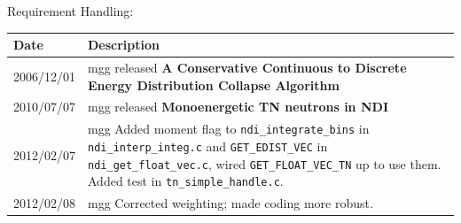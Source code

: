 Requirement Handling:

\begin{tabular}{|p{72pt}|p{351pt}|} \hline
Date & Description \\ \hline 

2006/12/01 & mgg released \textbf{A Conservative Continuous to
Discrete Energy Distribution Collapse Algorithm} \\ \hline

2010/07/07 & mgg released \textbf{Monoenergetic TN neutrons in NDI} \\
\hline

2012/02/07 & mgg Added moment flag to \texttt{ndi\_integrate\_bins} in
\texttt{ndi\_interp\_integ.c} and \texttt{GET\_EDIST\_VEC} in
\texttt{ndi\_get\_float\_vec.c}, wired \texttt{GET\_FLOAT\_VEC\_TN} up
to use them.  Added test in \texttt{tn\_simple\_handle.c}.\\ \hline

2012/02/08 & mgg Corrected weighting; made coding more robust.

\end{tabular}
